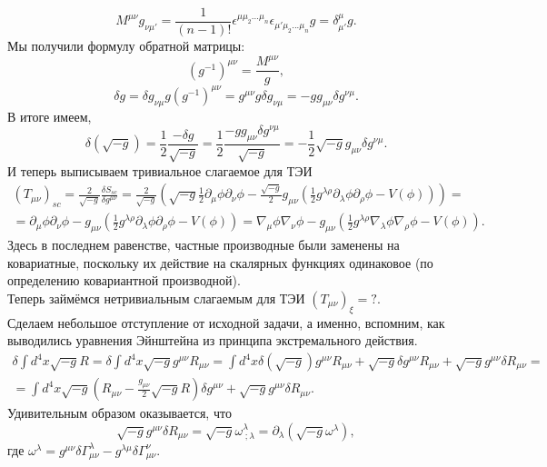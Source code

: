 \documentclass[12pt]{article}
\theoremstyle{definition}
\begin{document}
\begin{enumerate}
\begin{equation}
\end{equation}
\begin{equation}
     M^{\mu\nu}g_{\nu\mu'}=\frac{1}{(n-1)!}\epsilon^{\mu\mu_2...\mu_n}\epsilon_{\mu'\mu_2...\mu_n}g=\delta^\mu_{\mu'}g.
\end{equation}
Мы получили формулу обратной матрицы:
\begin{equation}
    (g^{-1})^{\mu\nu}=\frac{M^{\mu\nu}}{g},
\end{equation}
\begin{equation}
    \delta g=\delta g_{\nu\mu} g (g^{-1})^{\mu\nu}=g^{\mu\nu}g\delta g_{\nu\mu} =-g g_{\mu\nu}\delta g^{\nu\mu}.
\end{equation}
В итоге имеем,
\begin{equation}
    \delta\left(\sqrt{-g}\right)=\frac{1}{2} \frac{-\delta g}{\sqrt{-g}}=\frac{1}{2} \frac{-g g_{\mu\nu} \delta g^{\nu\mu}}{\sqrt{-g}}=-\frac{1}{2} \sqrt{-g} g_{\mu\nu}\delta g^{\nu\mu}.
\end{equation}
И теперь выписываем тривиальное слагаемое для ТЭИ
\begin{multline}
    \left(T_{\mu\nu}\right)_{sc}= \frac{2}{\sqrt{-g}}\frac{\delta S_{sc}}{\delta g^{\mu\nu}}= \frac{2}{\sqrt{-g}}\left(\sqrt{-g}\frac{1}{2}\partial_\mu\phi\partial_\nu\phi-\frac{\sqrt{-g}}{2}g_{\mu\nu}\left(\frac{1}{2}g^{\lambda\rho}\partial_\lambda\phi\partial_\rho\phi - V(\phi)\right)\right)=\\
    =\partial_\mu\phi\partial_\nu\phi-g_{\mu\nu}\left(\frac{1}{2}g^{\lambda\rho}\partial_\lambda\phi\partial_\rho\phi - V(\phi)\right)=\nabla_\mu\phi\nabla_\nu\phi-g_{\mu\nu}\left(\frac{1}{2}g^{\lambda\rho}\nabla_\lambda\phi\nabla_\rho\phi - V(\phi)\right).
\end{multline}
Здесь в последнем равенстве, частные производные были заменены на ковариатные, поскольку их действие на скалярных функциях одинаковое (по определению ковариантной производной).\\
Теперь займёмся нетривиальным слагаемым для ТЭИ $\left(T_{\mu\nu}\right)_{\xi}=?$.\\
Сделаем небольшое отступление от исходной задачи, а именно, вспомним, как выводились уравнения Эйнштейна из принципа экстремального действия.
\begin{multline}
    \delta \int d^4x\sqrt{-g} R=\delta \int d^4x\sqrt{-g} g^{\mu\nu}R_{\mu\nu}=\int d^4x\delta \left(\sqrt{-g}\right) g^{\mu\nu}R_{\mu\nu}+ \sqrt{-g}\delta g^{\mu\nu} R_{\mu\nu}+\sqrt{-g}g^{\mu\nu}\delta R_{\mu\nu}=\\
    = \int d^4x\sqrt{-g}\left(R_{\mu\nu}- \frac{g_{\mu\nu}}{2} \sqrt{-g}R\right)\delta g^{\mu\nu}+\sqrt{-g}g^{\mu\nu}\delta R_{\mu\nu}.
\end{multline}
Удивительным образом оказывается, что 
\begin{equation}\label{eq9}
    \sqrt{-g}g^{\mu\nu}\delta R_{\mu\nu} =\sqrt{-g} \omega^\lambda_{\; ;\lambda}= \partial_\lambda\left(\sqrt{-g}\omega^\lambda \right),
\end{equation} где $\omega^\lambda = g^{\mu\nu}\delta \Gamma^{\lambda}_{\mu\nu}-g^{\lambda\mu}\delta\Gamma^{\nu}_{\mu\nu}.$ 


\end{enumerate}
\end{document}
